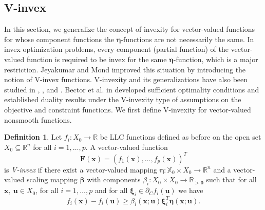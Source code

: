 \documentclass{article}
\theoremstyle{definition}
\newtheorem{maar}{Definition}[section]
\begin{document}

\subsection{V-invex}

In this section, we generalize the concept of invexity for vector-valued functions for whose component functions the $\boldsymbol \eta$-functions are not necessarily the same. In invex optimization problems, every component (partial function) of the vector-valued function is required to be invex for the same $\boldsymbol{\eta}$-function, which is a major restriction. Jeyakumar and Mond \cite{JeyMon} improved this situation by introducing the notion of V-invex functions. V-invexity and its generalizations have also been studied in \cite{MisGio}, \cite{MisMuk2}, and \cite{MisMuk3}. Bector et al. in \cite{Bec} developed sufficient optimality conditions and established duality results under the V-invexity type of assumptions on the objective and constraint functions. We first define V-invexity for vector-valued nonsmooth functions.

\begin{maar}
    \label{vinvex}\cite{JeyMon} Let $f_i : X_0 \rightarrow \mathbb R$ be LLC functions defined as before on the open set $X_{0}\subseteq\mathbb{R}^{n}$  for all $i=1,\dots,p$. A vector-valued function $$\boldsymbol F(\boldsymbol x) = (f_1(\boldsymbol x),\dots,f_p(\boldsymbol x))^T$$ is \emph{V-invex} if there exist a vector-valued mapping $\boldsymbol \eta : \mathbb X_0 \times X_0 \rightarrow \mathbb R^n$ and a vector-valued scaling mapping $\boldsymbol \beta$ with components $\beta_i : X_0 \times X_0 \rightarrow \mathbb R_{> \boldsymbol 0}$ such that for all $\boldsymbol x,\ \boldsymbol u \in X_0$, for all $i=1,\dots,p$  and for all $\boldsymbol \xi_i \in \partial_C f_i(\boldsymbol u)$ we have
$$f_i(\boldsymbol x) - f_i(\boldsymbol u) \geq \beta_i(\boldsymbol x; \boldsymbol u) \boldsymbol \xi^T_i \boldsymbol \eta(\boldsymbol x; \boldsymbol u).$$
\end{maar}
\end{document}
